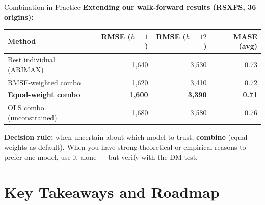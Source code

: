 \documentclass[aspectratio=169, 11pt]{beamer}
\begin{document}
\begin{frame}{Combination in Practice}
  \textbf{Extending our walk-forward results (RSXFS, 36 origins):}
  \begin{center}
    {\small
    \begin{tabular}{lrrr}
      \toprule
      \textbf{Method} & \textbf{RMSE ($h=1$)} & \textbf{RMSE ($h=12$)}
                      & \textbf{MASE (avg)} \\
      \midrule
      Best individual (ARIMAX) & 1{,}640 & 3{,}530 & 0.73 \\
      RMSE-weighted combo      & 1{,}620 & 3{,}410 & 0.72 \\
      \textbf{Equal-weight combo} & \textbf{1{,}600} & \textbf{3{,}390}
                                  & \textbf{0.71} \\
      OLS combo (unconstrained)& 1{,}680 & 3{,}580 & 0.76 \\
      \bottomrule
    \end{tabular}
    }
  \end{center}
  \begin{keybox}
    \textbf{Decision rule:} when uncertain about which model to trust,
    \textbf{combine} (equal weights as default). When you have strong
    theoretical or empirical reasons to prefer one model,
    use it alone --- but verify with the DM test.
  \end{keybox}
\end{frame}

\section{Key Takeaways and Roadmap}

\end{document}
